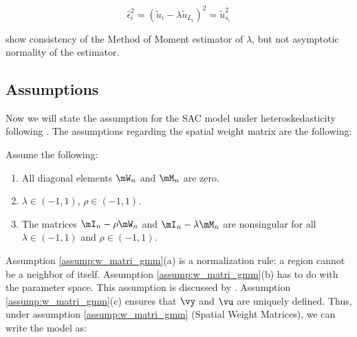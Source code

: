 \documentclass[english,12pt]{book}\usepackage[]{graphicx}\usepackage[]{xcolor}
\begin{document}
\begin{equation*}
\widehat{\epsilon}_i^2 = (\widetilde{u}_i - \lambda\widetilde{u}_{L_i})^2 = \widetilde{u}_{s_i}^2
\end{equation*}



% 



\begin{remark}
	\cite{kelejian1999generalized} show consistency of the Method of Moment estimator of $\lambda$, but not asymptotic normality of the estimator.
\end{remark}	



\subsection{Assumptions}

Now we will state the assumption for the SAC model under heteroskedasticity following \cite{arraiz2010spatial}. The assumptions regarding the spatial weight matrix are the following:

\begin{assumption}\label{assump:w_matri_gmm}
	Assume the following:
	\begin{enumerate}
		\item All diagonal elements $\mW_n$ and $\mM_n$ are zero.
		\item $\lambda\in (-1, 1)$, $\rho \in (-1, 1)$.
		\item The matrices $\mI_n - \rho \mW_n$ and $\mI_n - \lambda \mM_n$ are nonsingular for all $\lambda\in (-1, 1)$ and $\rho \in (-1, 1)$.
	\end{enumerate}
\end{assumption}	

Assumption \ref{assump:w_matri_gmm}(a) is a normalization rule: a region cannot be a neighbor of itself. Assumption \ref{assump:w_matri_gmm}(b) has to do with the parameter space. This assumption is discussed by \citet[section 2.2]{kelejian2010specification}. Assumption \ref{assump:w_matri_gmm}(c) ensures that $\vy$ and $\vu$ are uniquely defined. Thus, under assumption \ref{assump:w_matri_gmm} (Spatial Weight Matrices), we can write the model as:
\end{document}
